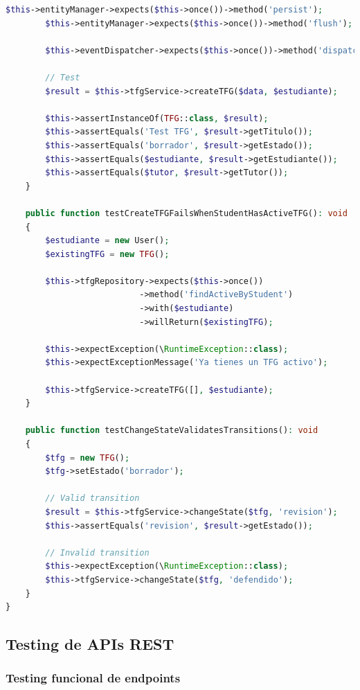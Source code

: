 \documentclass[12pt,a4paper,oneside]{report}
\begin{document}
\begin{lstlisting}[language=PHP]
        $this->entityManager->expects($this->once())->method('persist');
        $this->entityManager->expects($this->once())->method('flush');

        $this->eventDispatcher->expects($this->once())->method('dispatch');

        // Test
        $result = $this->tfgService->createTFG($data, $estudiante);

        $this->assertInstanceOf(TFG::class, $result);
        $this->assertEquals('Test TFG', $result->getTitulo());
        $this->assertEquals('borrador', $result->getEstado());
        $this->assertEquals($estudiante, $result->getEstudiante());
        $this->assertEquals($tutor, $result->getTutor());
    }

    public function testCreateTFGFailsWhenStudentHasActiveTFG(): void
    {
        $estudiante = new User();
        $existingTFG = new TFG();

        $this->tfgRepository->expects($this->once())
                           ->method('findActiveByStudent')
                           ->with($estudiante)
                           ->willReturn($existingTFG);

        $this->expectException(\RuntimeException::class);
        $this->expectExceptionMessage('Ya tienes un TFG activo');

        $this->tfgService->createTFG([], $estudiante);
    }

    public function testChangeStateValidatesTransitions(): void
    {
        $tfg = new TFG();
        $tfg->setEstado('borrador');

        // Valid transition
        $result = $this->tfgService->changeState($tfg, 'revision');
        $this->assertEquals('revision', $result->getEstado());

        // Invalid transition
        $this->expectException(\RuntimeException::class);
        $this->tfgService->changeState($tfg, 'defendido');
    }
}
\end{lstlisting}

\subsection{Testing de APIs REST}\label{testing-de-apis-rest}

\subsubsection{Testing funcional de
endpoints}\label{testing-funcional-de-endpoints}
\end{document}
